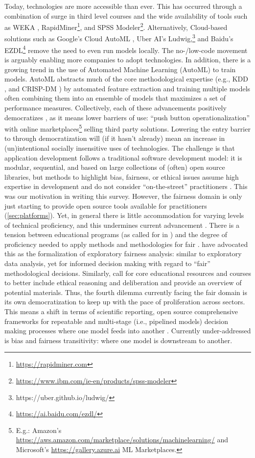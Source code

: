 \label{sec:skills}
Today, \ml technologies are more accessible than ever. This has occurred through a combination of surge in third level courses and the wide availability of \ml tools such as WEKA , RapidMiner\footnote{\url{https://rapidminer.com}}, and SPSS Modeler\footnote{\url{https://www.ibm.com/ie-en/products/spss-modeler}}. Alternatively, Cloud-based solutions such as Google's Cloud AutoML , Uber AI's Ludwig,\footnote{https://uber.github.io/ludwig/} and Baidu's EZDL\footnote{\url{https://ai.baidu.com/ezdl/}} remove the need to even run models locally. The no-/low-code \ml movement is arguably enabling more  companies to adopt \ml technologies.
In addition, there is a growing trend in the use of Automated Machine Learning (AutoML)  to train \ml models. AutoML abstracts much of the core methodological expertise (e.g., KDD , and CRISP-DM ) by automated feature extraction and training multiple models often combining them into an ensemble of models that maximizes a set of performance measures. Collectively, each of these advancements positively democratizes \ml, as it means lower barriers of use: ``push button operationalization''  with online marketplaces\footnote{E.g.: Amazon's \url{https://aws.amazon.com/marketplace/solutions/machinelearning/} and Microsoft's \url{https://gallery.azure.ai} ML Marketplaces.} selling third party \ml solutions. 
Lowering the entry barrier to \ml through democratization will (if it hasn't already) mean an increase in (un)intentional socially insensitive uses of \ml technologies. The challenge is that \ml application development follows a traditional software development model: it is modular, sequential, and based on large collections of (often) open source libraries, but methods to highlight bias, fairness, or ethical issues assume high expertise in \ml development and do not consider ``on-the-street'' practitioners . This was our motivation in writing this survey. However, the fairness domain is only just starting to provide open source tools available for practitioners (\autoref{sec:platforms}). Yet, in general there is little accommodation for varying levels of technical proficiency, and this undermines current advancement . There is a tension between educational programs (as called for in ) and the degree of proficiency needed to apply methods and methodologies for fair \ml.  have advocated this as the formalization of exploratory fairness analysis: similar to exploratory data analysis, yet for informed decision making with regard to ``fair'' methodological decisions. Similarly,  call for core \ml educational resources and courses to better include ethical reasoning and deliberation and provide an overview of potential materials. Thus, the fourth dilemma currently facing the fair \ml domain is its own democratization to keep up with the pace of \ml proliferation across sectors. This means a shift in terms of scientific reporting, open source comprehensive frameworks for repeatable and multi-stage (i.e., pipelined models) decision making processes where one model feeds into another . Currently under-addressed is bias and fairness transitivity: where one \ml model is downstream to another.


